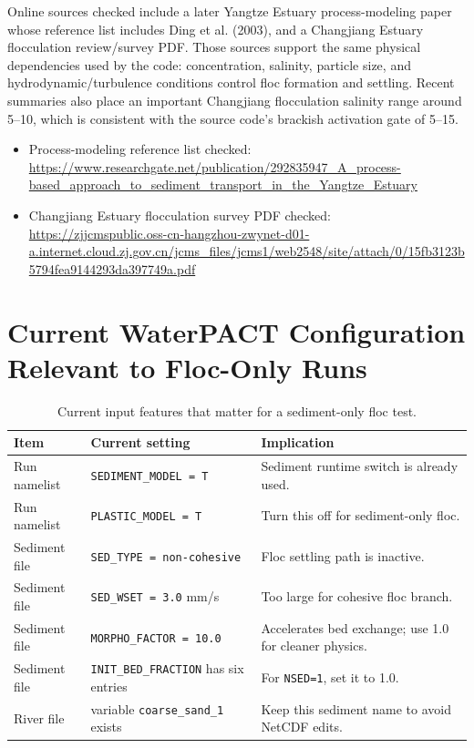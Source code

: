 \documentclass[11pt]{article}
\begin{document}
Online sources checked include a later Yangtze Estuary process-modeling paper
whose reference list includes Ding et al. (2003), and a Changjiang Estuary
flocculation review/survey PDF.  Those sources support the same physical
dependencies used by the code: concentration, salinity, particle size, and
hydrodynamic/turbulence conditions control floc formation and settling.  Recent
summaries also place an important Changjiang flocculation salinity range around
5--10, which is consistent with the source code's brackish activation gate of
5--15.
\begin{itemize}
  \item Process-modeling reference list checked:
        \url{https://www.researchgate.net/publication/292835947_A_process-based_approach_to_sediment_transport_in_the_Yangtze_Estuary}
  \item Changjiang Estuary flocculation survey PDF checked:
        \url{https://zjjcmspublic.oss-cn-hangzhou-zwynet-d01-a.internet.cloud.zj.gov.cn/jcms_files/jcms1/web2548/site/attach/0/15fb3123b5794fea9144293da397749a.pdf}
\end{itemize}

\section*{Current WaterPACT Configuration Relevant to Floc-Only Runs}

\begin{table}[H]
\centering
\caption{Current input features that matter for a sediment-only floc test.}
\small
\begin{tabular}{p{}p{}p{}}
\toprule
Item & Current setting & Implication \\
\midrule
Run namelist & \texttt{SEDIMENT\_MODEL = T} & Sediment runtime switch is already used. \\
Run namelist & \texttt{PLASTIC\_MODEL = T} & Turn this off for sediment-only floc. \\
Sediment file & \texttt{SED\_TYPE = non-cohesive} & Floc settling path is inactive. \\
Sediment file & \texttt{SED\_WSET = 3.0} mm/s & Too large for cohesive floc branch. \\
Sediment file & \texttt{MORPHO\_FACTOR = 10.0} & Accelerates bed exchange; use 1.0 for cleaner physics. \\
Sediment file & \texttt{INIT\_BED\_FRACTION} has six entries & For \texttt{NSED=1}, set it to 1.0. \\
River file & variable \texttt{coarse\_sand\_1} exists & Keep this sediment name to avoid NetCDF edits. \\
\bottomrule
\end{tabular}
\end{table}
\end{document}
